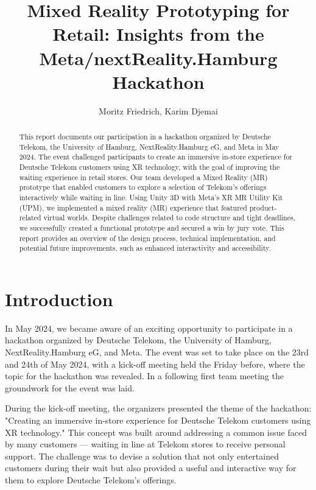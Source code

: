 \documentclass[12pt]{article}
\begin{document}
\title{Mixed Reality Prototyping for Retail: Insights from the Meta/nextReality.Hamburg Hackathon} 
\author{Moritz Friedrich, Karim Djemai}
\maketitle

\begin{abstract}
    This report documents our participation in a hackathon organized by Deutsche Telekom, the University of Hamburg, NextReality.Hamburg eG, and Meta in May 2024. The event challenged participants to create an immersive in-store experience for Deutsche Telekom customers using XR technology, with the goal of improving the waiting experience in retail stores. Our team developed a Mixed Reality (MR) prototype that enabled customers to explore a selection of Telekom’s offerings interactively while waiting in line. Using Unity 3D with Meta's XR MR Utility Kit (UPM), we implemented a mixed reality (MR) experience that featured product-related virtual worlds. Despite challenges related to code structure and tight deadlines, we successfully created a functional prototype and secured a win by jury vote. This report provides an overview of the design process, technical implementation, and potential future improvements, such as enhanced interactivity and accessibility.
\end{abstract}

\section{Introduction}
In May 2024, we became aware of an exciting opportunity to participate in a hackathon organized by Deutsche Telekom, the University of Hamburg, NextReality.Hamburg eG, and Meta. The event was set to take place on the 23rd and 24th of May 2024, with a kick-off meeting held the Friday before, where the topic for the hackathon was revealed. In a following first team meeting the groundwork for the event was laid. 

During the kick-off meeting, the organizers presented the theme of the hackathon: "Creating an immersive in-store experience for Deutsche Telekom customers using XR technology." This concept was built around addressing a common issue faced by many customers — waiting in line at Telekom stores to receive personal support. The challenge was to devise a solution that not only entertained customers during their wait but also provided a useful and interactive way for them to explore Deutsche Telekom’s offerings.
\end{document}
